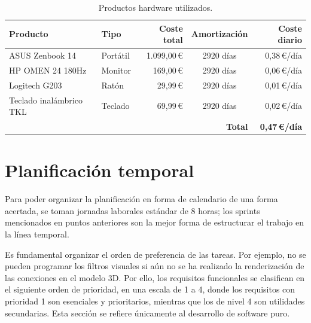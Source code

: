 \begin{table}[H]
	\centering
	\caption{Productos hardware utilizados.}
	\begin{tabularx}{\textwidth}{X l r c r}
		\toprule
		\textbf{Producto} & \textbf{Tipo} & \textbf{Coste total} & \textbf{Amortización} & \textbf{Coste diario} \\
		\midrule
		ASUS Zenbook 14         & Portátil & 1.099,00\,\euro{} & 2920 días & 0,38\,\euro{}/día \\
		HP OMEN 24 180Hz        & Monitor  & 169,00\,\euro{}   & 2920 días & 0,06\,\euro{}/día \\
		Logitech G203           & Ratón    & 29,99\,\euro{}    & 2920 días & 0,01\,\euro{}/día \\
		Teclado inalámbrico TKL & Teclado  & 69,99\,\euro{}    & 2920 días & 0,02\,\euro{}/día \\
		\midrule
		\multicolumn{4}{r}{\textbf{Total}} & \textbf{0,47\,\euro{}/día} \\
		\bottomrule
	\end{tabularx}
\end{table}

\section{Planificación temporal}

Para poder organizar la planificación en forma de calendario de una forma acertada, se
toman jornadas laborales estándar de 8 horas; los sprints mencionados en puntos anteriores
son la mejor forma de estructurar el trabajo en la línea temporal.

Es fundamental organizar el orden de preferencia de las tareas. Por ejemplo, no se pueden
programar los filtros visuales si aún no se ha realizado la renderización de las conexiones en
el modelo 3D. Por ello, los requisitos funcionales se clasifican en el siguiente orden de
prioridad, en una escala de 1 a 4, donde los requisitos con prioridad 1 son esenciales y
prioritarios, mientras que los de nivel 4 son utilidades secundarias. Esta sección se refiere
únicamente al desarrollo de software puro.

